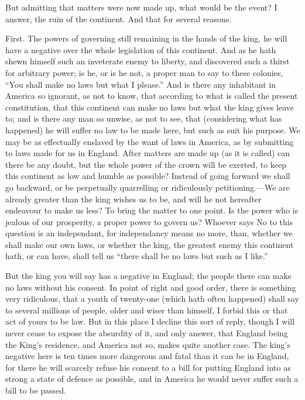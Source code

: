 \documentclass[12pt,oneside]{memoir}
\begin{document}
But admitting that matters were now made up, what would be the event? I answer, the ruin of the continent. And that for several reasons.

First. The powers of governing still remaining in the hands of the king, he will have a negative over the whole legislation of this continent. And as he hath shewn himself such an inveterate enemy to liberty, and discovered such a thirst for arbitrary power; is he, or is he not, a proper man to say to these colonies, ``You shall make no laws but what I please.'' And is there any inhabitant in America so ignorant, as not to know, that according to what is called the present constitution, that this continent can make no laws but what the king gives leave to; and is there any man so unwise, as not to see, that (considering what has happened) he will suffer no law to be made here, but such as suit his purpose. We may be as effectually enslaved by the want of laws in America, as by submitting to laws made for us in England. After matters are made up (as it is called) can there be any doubt, but the whole power of the crown will be exerted, to keep this continent as low and humble as possible? Instead of going forward we shall go backward, or be perpetually quarrelling or ridiculously petitioning.---We are already greater than the king wishes us to be, and will he not hereafter endeavour to make us less? To bring the matter to one point. Is the power who is jealous of our prosperity, a proper power to govern us? Whoever says No to this question is an independant, for independancy means no more, than, whether we shall make our own laws, or whether the king, the greatest enemy this continent hath, or can have, shall tell us ``there shall be no laws but such as I like.''

But the king you will say has a negative in England; the people there can make no laws without his consent. In point of right and good order, there is something very ridiculous, that a youth of twenty-one (which hath often happened) shall say to several millions of people, older and wiser than himself, I forbid this or that act of yours to be law. But in this place I decline this sort of reply, though I will never cease to expose the absurdity of it, and only answer, that England being the King's residence, and America not so, makes quite another case. The king's negative here is ten times more dangerous and fatal than it can be in England, for there he will scarcely refuse his consent to a bill for putting England into as strong a state of defence as possible, and in America he would never suffer such a bill to be passed.
\end{document}
